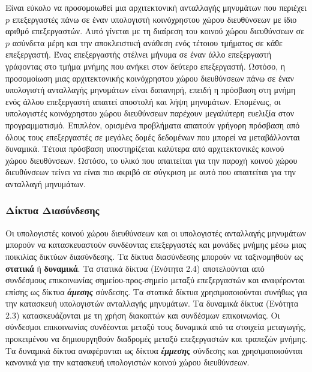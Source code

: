 \documentclass[12pt,a4paper]{article} %
\begin{document}
Είναι εύκολο να προσομοιωθεί μια αρχιτεκτονική ανταλλαγής μηνυμάτων που
περιέχει \(p\) επεξεργαστές πάνω σε έναν υπολογιστή κοινόχρηστου χώρου 
διευθύνσεων με ίδιο αριθμό επεξεργαστών. Αυτό γίνεται με τη διαίρεση του 
κοινού χώρου διευθύνσεων σε \(p\) ασύνδετα μέρη και την αποκλειστική 
ανάθεση ενός τέτοιου τμήματος σε κάθε επεξεργαστή. Ένας επεξεργαστής 
στέλνει μήνυμα σε έναν άλλο επεξεργαστή γράφοντας στο τμήμα μνήμης που 
ανήκει στον δεύτερο επεξεργαστή. Ωστόσο, η προσομοίωση μιας αρχιτεκτονικής 
κοινόχρηστου χώρου διευθύνσεων πάνω σε έναν υπολογιστή ανταλλαγής μηνυμάτων 
είναι δαπανηρή, επειδή η πρόσβαση στη μνήμη ενός άλλου επεξεργαστή 
απαιτεί αποστολή και λήψη μηνυμάτων. Επομένως, οι υπολογιστές κοινόχρηστου 
χώρου διευθύνσεων παρέχουν μεγαλύτερη ευελιξία στον προγραμματισμό. 
Επιπλέον, ορισμένα προβλήματα απαιτούν γρήγορη πρόσβαση από όλους τους 
επεξεργαστές σε μεγάλες δομές δεδομένων που μπορεί να μεταβάλλονται 
δυναμικά. Τέτοια πρόσβαση υποστηρίζεται καλύτερα από αρχιτεκτονικές 
κοινού χώρου διευθύνσεων. Ωστόσο, το υλικό που απαιτείται για την παροχή 
κοινού χώρου διευθύνσεων τείνει να είναι πιο ακριβό σε σύγκριση με αυτό 
που απαιτείται για την ανταλλαγή μηνυμάτων.

\subsubsection{Δίκτυα Διασύνδεσης}
Οι υπολογιστές κοινού χώρου διευθύνσεων και οι υπολογιστές ανταλλαγής μηνυμάτων
μπορούν να κατασκευαστούν συνδέοντας επεξεργαστές και μονάδες μνήμης μέσω μιας
ποικιλίας δικτύων διασύνδεσης. Τα δίκτυα διασύνδεσης μπορούν να ταξινομηθούν ως
\textbf{στατικά} ή \textbf{δυναμικά}. Τα στατικά δίκτυα (Ενότητα 2.4)
αποτελούνται από συνδέσμους επικοινωνίας σημείου-προς-σημείο μεταξύ επεξεργαστών
και αναφέρονται επίσης ως δίκτυα \textit{\textbf{άμεσης}} σύνδεσης. Τα στατικά δίκτυα
χρησιμοποιούνται συνήθως για την κατασκευή υπολογιστών ανταλλαγής μηνυμάτων.
Τα δυναμικά δίκτυα (Ενότητα 2.3) κατασκευάζονται με τη χρήση διακοπτών και
συνδέσμων επικοινωνίας. Οι σύνδεσμοι επικοινωνίας συνδέονται μεταξύ τους δυναμικά
από τα στοιχεία μεταγωγής, προκειμένου να δημιουργηθούν διαδρομές μεταξύ
επεξεργαστών και τραπεζών μνήμης. Τα δυναμικά δίκτυα αναφέρονται ως δίκτυα
\textit{\textbf{έμμεσης}} σύνδεσης και χρησιμοποιούνται κανονικά για την κατασκευή
υπολογιστών κοινού χώρου διευθύνσεων.
\end{document}
